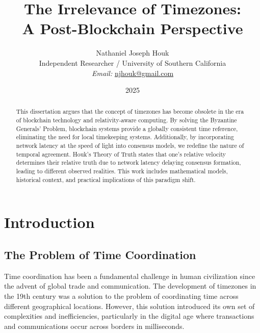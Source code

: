 \documentclass[12pt]{report}
\begin{document}
\title{The Irrelevance of Timezones: \\ A Post-Blockchain Perspective}

\author{Nathaniel Joseph Houk\\
Independent Researcher / University of Southern California\\
\textit{Email:} \href{mailto:njhouk@gmail.com}{njhouk@gmail.com}}
\date{2025}

\maketitle

\begin{abstract}
This dissertation argues that the concept of timezones has become obsolete in the era of blockchain technology and relativity-aware computing. By solving the Byzantine Generals' Problem, blockchain systems provide a globally consistent time reference, eliminating the need for local timekeeping systems. Additionally, by incorporating network latency at the speed of light into consensus models, we redefine the nature of temporal agreement. Houk's Theory of Truth states that one's relative velocity determines their relative truth due to network latency delaying consensus formation, leading to different observed realities. This work includes mathematical models, historical context, and practical implications of this paradigm shift.
\end{abstract}

\chapter{Introduction}

\section{The Problem of Time Coordination}
Time coordination has been a fundamental challenge in human civilization since the advent of global trade and communication. The development of timezones in the 19th century was a solution to the problem of coordinating time across different geographical locations. However, this solution introduced its own set of complexities and inefficiencies, particularly in the digital age where transactions and communications occur across borders in milliseconds.
\end{document}
